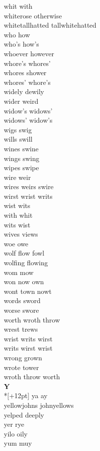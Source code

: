 whit with\\
whiterose otherwise\\
whitetallhatted tallwhitehatted\\
who how\\
who's how's\\
whoever however\\
whore's whores'\\
whores shower\\
whores' whore's\\
widely dewily\\
wider weird\\
widow's widows'\\
widows' widow's\\
wigs swig\\
wills swill\\
wines swine\\
wings swing\\
wipes swipe\\
wire weir\\
wires weirs swire\\
wirst wrist writs\\
wist wits\\
with whit\\
wits wist\\
wives views\\
woe owe\\
wolf flow fowl\\
wolfing flowing\\
wom mow\\
won now own\\
wont town nowt\\
words sword\\
worse swore\\
worth wroth throw\\
wrest trews\\
wrist writs wirst\\
writs wirst wrist\\
wrong grown\\
wrote tower\\
wroth throw worth\\

\vspace{14pt}
\noindent\textbf{\Large Y}\\*[+12pt]
ya ay\\
yellowjohns johnyellows\\
yelped deeply\\
yer rye\\
yilo oily\\
yum muy\\
